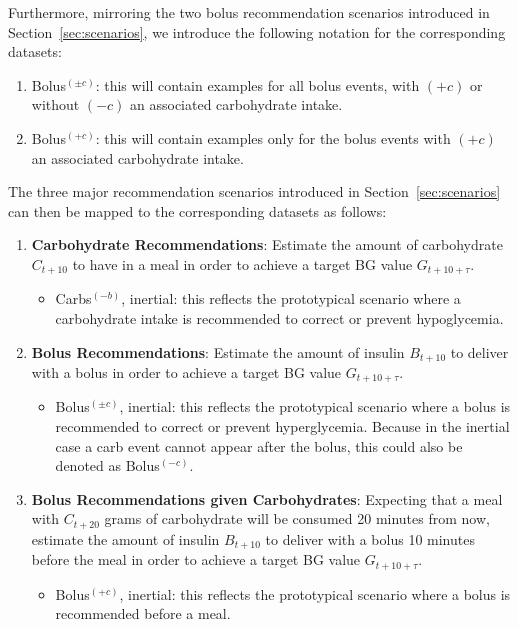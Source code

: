 \documentclass[journal,article,submit,moreauthors,pdftex]{Definitions/mdpi}
\begin{document}
Furthermore, mirroring the two bolus recommendation scenarios introduced in Section~\ref{sec:scenarios}, we introduce the following notation for the corresponding datasets:
\begin{enumerate}
    \item Bolus$^{(\pm c)}$: this will contain examples for all bolus events, with $(+c)$ or without $(-c)$ an associated carbohydrate intake.
    \item Bolus$^{(+c)}$: this will contain examples only for the bolus events with $(+c)$ an associated carbohydrate intake.
\end{enumerate}
The three major recommendation scenarios introduced in Section~\ref{sec:scenarios} can then be mapped to the corresponding datasets as follows:
\begin{enumerate}
    \item {\bf Carbohydrate Recommendations}: Estimate the amount of carbohydrate $C_{t+10}$ to have in a meal in order to achieve a target BG value $G_{t+10+\tau}$.
    \begin{itemize}
        \item Carbs$^{(-b)}$, inertial: this reflects the prototypical scenario where a carbohydrate intake is recommended to correct or prevent hypoglycemia.
    \end{itemize}
    \item {\bf Bolus Recommendations}: Estimate the amount of insulin $B_{t+10}$ to deliver with a bolus in order to achieve a target BG value $G_{t+10+\tau}$.
    \begin{itemize}
        \item Bolus$^{(\pm c)}$, inertial: this reflects the prototypical scenario where a bolus is recommended to correct or prevent hyperglycemia. Because in the inertial case a carb event cannot appear after the bolus, this could also be denoted as Bolus$^{(-c)}$.
    \end{itemize}
    \item {\bf Bolus Recommendations given Carbohydrates}: Expecting that a meal with $C_{t+20}$ grams of carbohydrate will be consumed 20 minutes from now, estimate the amount of insulin $B_{t+10}$ to deliver with a bolus 10 minutes before the meal in order to achieve a target BG value $G_{t+10+\tau}$.
    \begin{itemize}
        \item Bolus$^{(+c)}$, inertial: this reflects the prototypical scenario where a bolus is recommended before a meal.
    \end{itemize}
\end{enumerate}
\end{document}
